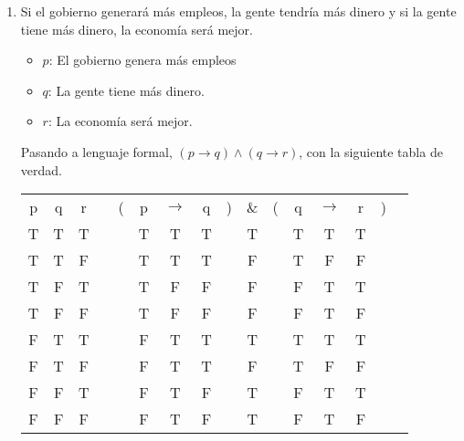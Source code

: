 \documentclass[a4paper,10pt]{article}
\begin{document}
\begin{enumerate}
\item Si el gobierno generará más empleos, la gente tendría más dinero y si la gente tiene más dinero, la economía será mejor.

\begin{itemize}
 \item \(p\): El gobierno genera más empleos
 \item \(q\): La gente tiene más dinero.
 \item \(r\): La economía será mejor.
\end{itemize}

Pasando a lenguaje formal, \((p \to q) \land (q \to r) \), con la siguiente tabla de verdad.
\begin{center}
\begin{tabular}{@{ }c@{ }@{ }c@{ }@{ }c c@{ }@{}c@{}@{ }c@{ }@{ }c@{ }@{ }c@{ }@{}c@{}@{ }c@{ }@{}c@{}@{ }c@{ }@{ }c@{ }@{ }c@{ }@{}c@{}@{ }c}
p & q & r &  & ( & p & $\rightarrow$ & q & ) & $\&$ & ( & q & $\rightarrow$ & r & ) & \\
T & T & T &  &  & T & T & T &  & T &  & T & T & T &  & \\
T & T & F &  &  & T & T & T &  & F &  & T & F & F &  & \\
T & F & T &  &  & T & F & F &  & F &  & F & T & T &  & \\
T & F & F &  &  & T & F & F &  & F &  & F & T & F &  & \\
F & T & T &  &  & F & T & T &  & T &  & T & T & T &  & \\
F & T & F &  &  & F & T & T &  & F &  & T & F & F &  & \\
F & F & T &  &  & F & T & F &  & T &  & F & T & T &  & \\
F & F & F &  &  & F & T & F &  & T &  & F & T & F &  & \\
\end{tabular}
\end{center}

\end{enumerate}
\end{document}
